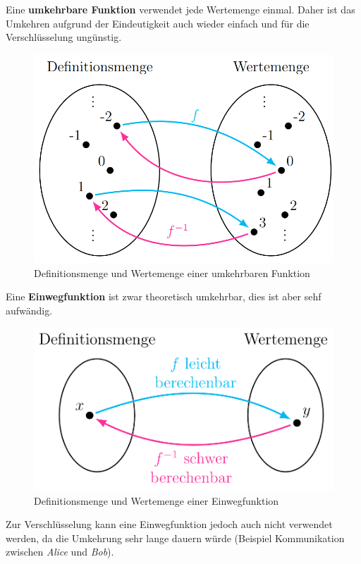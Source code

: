 Eine \textbf{umkehrbare Funktion} verwendet jede Wertemenge einmal. Daher ist das Umkehren aufgrund der Eindeutigkeit auch wieder einfach und für die Verschlüsselung ungünstig.
\begin{figure}[H]
	\centering
	\includegraphics[width=0.8\linewidth]{figures/umkehr_func.png}
	\caption{Definitionsmenge und Wertemenge einer umkehrbaren Funktion}
\end{figure}

Eine \textbf{Einwegfunktion} ist zwar theoretisch umkehrbar, dies ist aber sehf aufwändig.
\begin{figure}[H]
	\centering
	\includegraphics[width=0.8\linewidth]{figures/einweg_func.png}
	\caption{Definitionsmenge und Wertemenge einer Einwegfunktion}
\end{figure}
Zur Verschlüsselung kann eine Einwegfunktion jedoch auch nicht verwendet werden, da die Umkehrung sehr lange dauern würde (Beispiel Kommunikation zwischen \textit{Alice} und \textit{Bob}).

